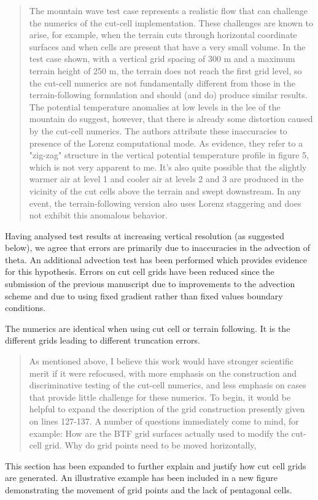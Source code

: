 \documentclass{article}
\begin{document}
\begin{quotation}
The mountain wave test case represents a realistic flow that can 
challenge the numerics of the cut-cell implementation. These
challenges are known to arise, for example, when the terrain cuts
through horizontal coordinate surfaces and when cells are present
that have a very small volume. In the test case shown, with a
vertical grid spacing of 300 m and a maximum terrain height of 250 m,
the terrain does not reach the first grid level, so the cut-cell
numerics are not fundamentally different from those in the
terrain-following formulation and should (and do) produce similar
results. The potential temperature anomalies at low levels in the lee
of the mountain do suggest, however, that there is already some
distortion caused by the cut-cell numerics. The authors attribute
these inaccuracies to presence of the Lorenz computational mode. As
evidence, they refer to a "zig-zag" structure in the vertical
potential temperature profile in figure 5, which is not very apparent
to me. It's also quite possible that the slightly warmer air at level
1 and cooler air at levels 2 and 3 are produced in the vicinity of
the cut cells above the terrain and swept downstream. In any event,
the terrain-following version also uses Lorenz staggering and does
not exhibit this anomalous behavior.
\end{quotation}
Having analysed test results at increasing vertical resolution (as
suggested below), we agree that errors are primarily due to inaccuracies
in the advection of theta.  An additional advection test has been
performed which provides evidence for this hypothesis.  Errors on cut
cell grids have been reduced since the submission of the previous manuscript due to improvements to the advection scheme and due to using fixed gradient rather than fixed values boundary conditions.

The numerics are identical when using cut cell or terrain following. It is the different grids leading to different truncation errors. 

\begin{quotation}
As mentioned above, I believe this work would have stronger
scientific merit if it were refocused, with more emphasis on the
construction and discriminative testing of the cut-cell numerics, and
less emphasis on cases that provide little challenge for these
numerics. To begin, it would be helpful to expand the description of
the grid construction presently given on lines 127-137. A number of
questions immediately come to  mind, for example: How are the BTF
grid surfaces actually used to modify the cut-cell grid. Why do grid
points need to be moved horizontally,
\end{quotation}
This section has been expanded to further explain and justify how cut
cell grids are generated.  An illustrative example has been included in
a new figure demonstrating the movement of grid points and the lack of
pentagonal cells. 
\end{document}
